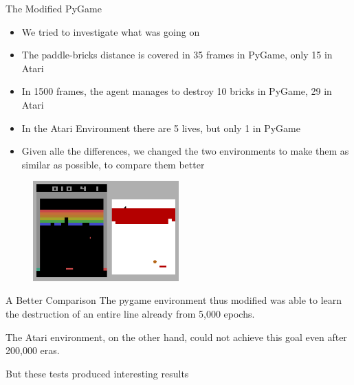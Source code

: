 
\begin{frame}{The Modified PyGame}
    \begin{itemize}
	\item We tried to investigate what was going on
	\item The paddle-bricks distance is covered in 35 frames in PyGame, only 15 in Atari
	\item In 1500 frames, the agent manages to destroy 10 bricks in PyGame, 29 in Atari
	\item In the Atari Environment there are 5 lives, but only 1 in PyGame
	\item Given alle the differences, we changed the two environments to make them as similar as possible, to compare them better
    \end{itemize}
    \begin{figure}
        \includegraphics[width=0.5\textwidth]{images/modified-pygame-comparison.png}
    \end{figure}
\end{frame}

\begin{frame}{A Better Comparison}
The pygame environment thus modified was able to learn the destruction of an entire line already from 5,000 epochs.

\bigskip
The Atari environment, on the other hand, could not achieve this goal even after 200,000 eras.

\bigskip
But these tests produced interesting results
\end{frame}

